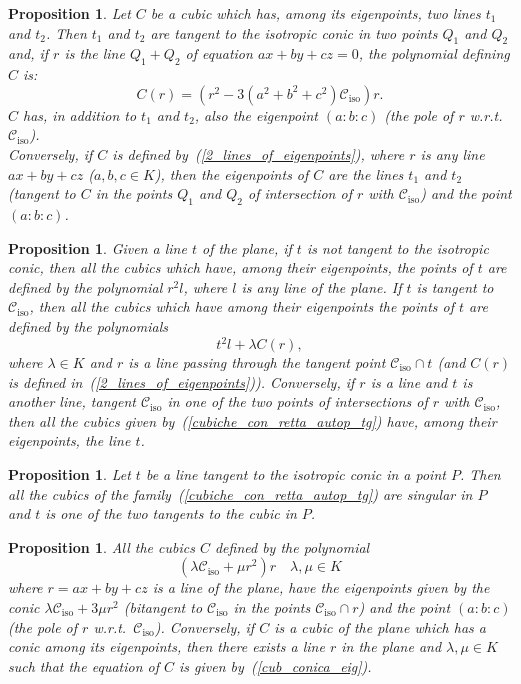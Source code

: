 \documentclass[11pt, a4paper, reqno, captions=tableheading,bibliography=totoc]{scrartcl}
\theoremstyle{plain}
\newtheorem{prop}[lemma]{Proposition}
\theoremstyle{definition}
\newcommand{\iso}{\mathcal{C}_{\mathrm{iso}}}
\begin{document}
\begin{prop}
\label{cubiche_con_2_rette}
Let $C$ be a cubic which has, among its eigenpoints, two lines $t_1$
and $t_2$. Then $t_1$ and $t_2$ are tangent to the isotropic conic
in two points $Q_1$ and $Q_2$ and, if $r$ is the line $Q_1+Q_2$
of equation $ax+by+cz=0$, the polynomial defining $C$ is:
\begin{equation}
C(r) = \left(r^2-3\left(a^2+b^2+c^2\right)\iso\right)r.
\label{2_lines_of_eigenpoints}
\end{equation}
$C$ has, in addition to $t_1$ and $t_2$, also the eigenpoint $(a: b: c)$
(the pole of $r$ w.r.t.\ $\iso$). \\
Conversely, if $C$ is defined by~(\ref{2_lines_of_eigenpoints}), where
$r$ is any line $ax+by+cz$ ($a, b, c \in K$), then
the eigenpoints of $C$ are the lines $t_1$ and $t_2$ (tangent to $C$
in the points $Q_1$ and $Q_2$ of intersection of $r$ with $\iso$) and
the point $(a: b: c)$.
\end{prop}


\begin{prop}
Given a line $t$ of the plane, if $t$ is not tangent to the isotropic
conic, then all the cubics which have, among their
eigenpoints, the points of $t$ are defined by the polynomial $r^2l$,
where $l$ is any line of the plane. If $t$ is tangent to $\iso$, then
all the cubics which have among their eigenpoints the points of $t$ are
defined by the polynomials
\begin{equation}
\label{cubiche_con_retta_autop_tg}
t^2l+\lambda C(r),
\end{equation}
where $\lambda \in K$ and $r$ is a line
passing through the tangent point $\iso\cap t$ (and $C(r)$ is defined
in~(\ref{2_lines_of_eigenpoints})). Conversely, if $r$ is a line and
$t$ is another line, tangent $\iso$ in one of the two points of intersections
of $r$ with $\iso$, then all the cubics given
by~(\ref{cubiche_con_retta_autop_tg}) have, among their eigenpoints,
the line $t$.
\end{prop}


\begin{prop}
Let $t$ be a line tangent to the isotropic conic in a point $P$. Then all the
cubics of the family~(\ref{cubiche_con_retta_autop_tg}) are singular in
$P$ and $t$ is one of the two tangents to the cubic in $P$.
\end{prop}

\begin{prop} All the cubics $C$ defined by the polynomial
\begin{equation}
\label{cub_conica_eig}
(\lambda \iso + \mu r^2)r \quad \mbox{$\lambda, \mu \in K$}
\end{equation}
where $r=ax+by+cz$ is a line of the plane,
have the eigenpoints given by the conic
$\lambda \iso+3\mu r^2$ (bitangent to $\iso$ in the points $\iso \cap r$)
and the point $(a:b:c)$ (the pole of $r$
w.r.t.\ $\iso$). Conversely, if
$C$ is a cubic of the plane which has a conic among its eigenpoints,
then there exists a line $r$ in the plane and $\lambda, \mu \in K$
such that the equation of
$C$ is given by~(\ref{cub_conica_eig}).
\end{prop}
\end{document}
